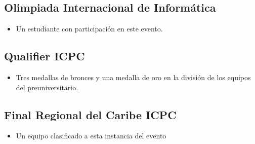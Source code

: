 \subsection{Olimpiada Internacional de Informática}

\begin{itemize}
	\item Un estudiante con participación en este evento.
\end{itemize}

\subsection{Qualifier ICPC}

\begin{itemize}
	\item Tres medallas de bronces y una medalla de oro en la división de los equipos del preuniversitario.
\end{itemize}

\subsection{Final Regional del Caribe ICPC}

\begin{itemize}
	\item Un equipo clasificado a esta instancia del evento
\end{itemize}